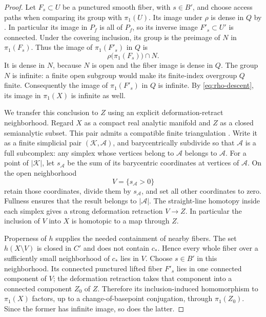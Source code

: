 \begin{proof}
Let $F_s\subset U$ be a punctured smooth fiber, with $s\in B'$,
and choose access paths when comparing its group with $\pi_1(U)$.
Its image under $\rho$ is dense in $Q$ by
.  In particular its image in $P_f$
is all of $P_f$, so its inverse image $F'_s\subset U'$ is
connected.  Under the covering inclusion, its group is the
preimage of $N$ in $\pi_1(F_s)$.  Thus the image of
$\pi_1(F'_s)$ in $Q$ is
\[
  \rho\bigl(\pi_1(F_s)\bigr)\cap N.
\]
It is dense in $N$, because $N$ is open and the fiber image is
dense in $Q$.  The group $N$ is infinite: a finite open subgroup
would make its finite-index overgroup $Q$ finite.  Consequently
the image of $\pi_1(F'_s)$ in $Q$ is infinite.  By
\eqref{eq:rho-descent}, its image in $\pi_1(X)$ is infinite as
well.

We transfer this conclusion to $Z$ using an explicit
deformation-retract neighborhood.  Regard $X$ as a compact real analytic
manifold and $Z$ as a closed semianalytic subset.  This pair admits a
compatible finite triangulation
\citep[Section 3, Theorem 2, p.~464]{Lojasiewicz1964}.
Write it as a finite simplicial pair $(\mathcal K,\mathcal A)$,
and barycentrically subdivide so that $\mathcal A$ is a full
subcomplex: any simplex whose vertices belong to $\mathcal A$
belongs to $\mathcal A$.  For a point of $|\mathcal K|$, let $s_{\mathcal A}$
be the sum of its barycentric coordinates at vertices of
$\mathcal A$.  On the open neighborhood
\[
  V=\{s_{\mathcal A}>0\}
\]
retain those coordinates, divide them by $s_{\mathcal A}$, and
set all other coordinates to zero.  Fullness ensures that the
result belongs to $|\mathcal A|$.  The straight-line homotopy
inside each simplex gives a strong deformation retraction
$V\to Z$.  In particular the inclusion of $V$ into $X$ is
homotopic to a map through $Z$.

Properness of $h$ supplies the needed containment of nearby
fibers.  The set $h(X\setminus V)$ is closed in $C'$ and does
not contain $c_*$.  Hence every whole fiber over a sufficiently
small neighborhood of $c_*$ lies in $V$.  Choose $s\in B'$ in
this neighborhood.  Its connected punctured lifted fiber
$F'_s$ lies in one connected component of $V$; the deformation
retraction takes that component into a connected component
$Z_0$ of $Z$.  Therefore its inclusion-induced homomorphism to
$\pi_1(X)$ factors, up to a change-of-basepoint conjugation,
through $\pi_1(Z_0)$.  Since the former has infinite image, so
does the latter.
\end{proof}

